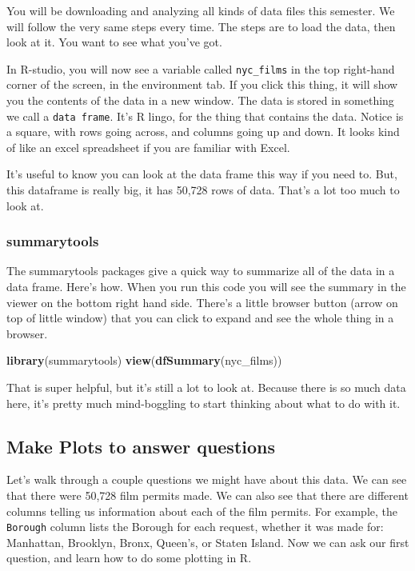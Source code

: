 \documentclass[]{book}
\newenvironment{Shaded}{\begin{snugshade}}{\end{snugshade}}
\newcommand{\KeywordTok}[1]{\textcolor[rgb]{0.13,0.29,0.53}{\textbf{{#1}}}}
\newcommand{\NormalTok}[1]{{#1}}
\theoremstyle{definition}
\theoremstyle{definition}
\theoremstyle{definition}
\theoremstyle{remark}
\begin{document}
You will be downloading and analyzing all kinds of data files this
semester. We will follow the very same steps every time. The steps are
to load the data, then look at it. You want to see what you've got.

In R-studio, you will now see a variable called \texttt{nyc\_films} in
the top right-hand corner of the screen, in the environment tab. If you
click this thing, it will show you the contents of the data in a new
window. The data is stored in something we call a \texttt{data\ frame}.
It's R lingo, for the thing that contains the data. Notice is a square,
with rows going across, and columns going up and down. It looks kind of
like an excel spreadsheet if you are familiar with Excel.

It's useful to know you can look at the data frame this way if you need
to. But, this dataframe is really big, it has 50,728 rows of data.
That's a lot too much to look at.

\subsubsection{summarytools}\label{summarytools}

The summarytools packages give a quick way to summarize all of the data
in a data frame. Here's how. When you run this code you will see the
summary in the viewer on the bottom right hand side. There's a little
browser button (arrow on top of little window) that you can click to
expand and see the whole thing in a browser.

\begin{Shaded}
\begin{Highlighting}[]
\KeywordTok{library}\NormalTok{(summarytools)}
\KeywordTok{view}\NormalTok{(}\KeywordTok{dfSummary}\NormalTok{(nyc_films))}
\end{Highlighting}
\end{Shaded}

That is super helpful, but it's still a lot to look at. Because there is
so much data here, it's pretty much mind-boggling to start thinking
about what to do with it.

\subsection{Make Plots to answer
questions}\label{make-plots-to-answer-questions}

Let's walk through a couple questions we might have about this data. We
can see that there were 50,728 film permits made. We can also see that
there are different columns telling us information about each of the
film permits. For example, the \texttt{Borough} column lists the Borough
for each request, whether it was made for: Manhattan, Brooklyn, Bronx,
Queen's, or Staten Island. Now we can ask our first question, and learn
how to do some plotting in R.
\end{document}
